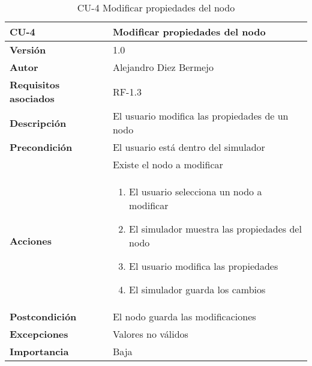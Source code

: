 \begin{table}[p]
	\centering
	\begin{tabularx}{\linewidth}{ p{} p{} }
		\toprule
		\textbf{CU-4}    & \textbf{Modificar propiedades del nodo}\\
		\toprule
		\textbf{Versión}              & 1.0    \\
		\textbf{Autor}                & Alejandro Diez Bermejo \\
		\textbf{Requisitos asociados} & RF-1.3 \\
		\textbf{Descripción}          & El usuario modifica las propiedades de un nodo \\
		\textbf{Precondición}         & El usuario está dentro del simulador \\
                                      & Existe el nodo a modificar \\
		\textbf{Acciones}             &
		\begin{enumerate}
			\def\labelenumi{\arabic{enumi}.}
			\tightlist
			\item El usuario selecciona un nodo a modificar
            \item El simulador muestra las propiedades del nodo
            \item El usuario modifica las propiedades
            \item El simulador guarda los cambios
		\end{enumerate}\\
		\textbf{Postcondición}        & El nodo guarda las modificaciones \\
		\textbf{Excepciones}          & Valores no válidos \\
		\textbf{Importancia}          & Baja \\
		\bottomrule
	\end{tabularx}
	\caption{CU-4 Modificar propiedades del nodo}
\end{table}

